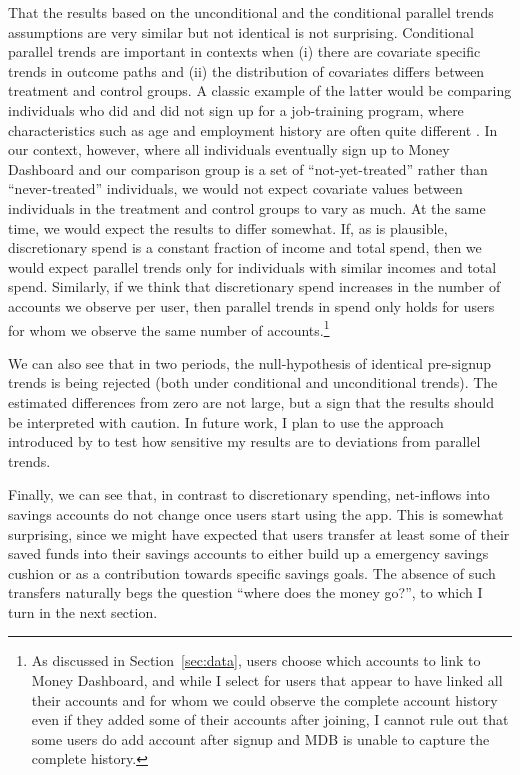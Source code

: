 That the results based on the unconditional and the conditional parallel trends
assumptions are very similar but not identical is not surprising. Conditional
parallel trends are important in contexts when (i) there are covariate specific
trends in outcome paths and (ii) the distribution of covariates differs between
treatment and control groups. A classic example of the latter would be
comparing individuals who did and did not sign up for a job-training program,
where characteristics such as age and employment history are often quite
different \citep{heckman1997matching}. In our context, however, where all
individuals eventually sign up to Money Dashboard and our comparison group is a
set of ``not-yet-treated'' rather than ``never-treated'' individuals, we would
not expect covariate values between individuals in the treatment and control
groups to vary as much. At the same time, we would expect the results to differ
somewhat. If, as is plausible, discretionary spend is a constant fraction of
income and total spend, then we would expect parallel trends only for
individuals with similar incomes and total spend. Similarly, if we think that
discretionary spend increases in the number of accounts we observe per user,
then parallel trends in spend only holds for users for whom we observe the same
number of accounts.\footnote{As discussed in Section~\ref{sec:data}, users
    choose which accounts to link to Money Dashboard, and while I select for
    users that appear to have linked all their accounts and for whom we could
    observe the complete account history even if they added some of their
accounts after joining, I cannot rule out that some users do add account after
signup and MDB is unable to capture the complete history.}

We can also see that in two periods, the null-hypothesis of identical
pre-signup trends is being rejected (both under conditional and unconditional
trends). The estimated differences from zero are not large, but a sign that the
results should be interpreted with caution. In future work, I plan to use the
approach introduced by \citet{rambachan2022more} to test how sensitive my
results are to deviations from parallel trends.

Finally, we can see that, in contrast to discretionary spending, net-inflows
into savings accounts do not change once users start using the app. This is
somewhat surprising, since we might have expected that users transfer at least
some of their saved funds into their savings accounts to either build up a
emergency savings cushion or as a contribution towards specific savings goals.
The absence of such transfers naturally begs the question ``where does the
money go?'', to which I turn in the next section.


